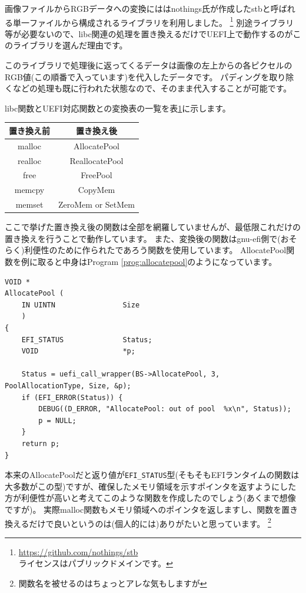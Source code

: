 \documentclass[10pt,b5paper,twoside,openany]{ltjsbook}
\begin{document}
画像ファイルからRGBデータへの変換にははnothings氏が作成したstbと呼ばれる単一ファイルから構成されるライブラリを利用しました。
\footnote{\url{https://github.com/nothings/stb} \\ ライセンスはパブリックドメインです。}
別途ライブラリ等が必要ないので、libc関連の処理を置き換えるだけでUEFI上で動作するのがこのライブラリを選んだ理由です。

このライブラリで処理後に返ってくるデータは画像の左上からの各ピクセルのRGB値(この順番で入っています)を代入したデータです。
パディングを取り除くなどの処理も既に行われた状態なので、そのまま代入することが可能です。

libc関数とUEFI対応関数との変換表の一覧を表\ref{tb:function}に示します。
\begin{table}[H]
    \centering
    \begin{tabular}{|c|c|}
        \hline
        置き換え前 & 置き換え後 \\
        \hline
        malloc & AllocatePool \\
        realloc & ReallocatePool \\
        free & FreePool \\
        memcpy & CopyMem \\
        memset & ZeroMem or SetMem \\
        \hline
    \end{tabular}
    \label{tb:function}
\end{table}
ここで挙げた置き換え後の関数は全部を網羅していませんが、最低限これだけの置き換えを行うことで動作しています。
また、変換後の関数はgnu-efi側で(おそらく)利便性のために作られたであろう関数を使用しています。
AllocatePool関数を例に取ると中身はProgram \ref{prog:allocatepool}のようになっています。
\begin{lstlisting}[style=customC,caption=AllocatePool function,label=prog:allocatepool]
VOID *
AllocatePool (
    IN UINTN                Size
    )
{
    EFI_STATUS              Status;
    VOID                    *p;

    Status = uefi_call_wrapper(BS->AllocatePool, 3, PoolAllocationType, Size, &p);
    if (EFI_ERROR(Status)) {
        DEBUG((D_ERROR, "AllocatePool: out of pool  %x\n", Status));
        p = NULL;
    }
    return p;
}
\end{lstlisting}
本来のAllocatePoolだと返り値が\verb+EFI_STATUS+型(そもそもEFIランタイムの関数は大多数がこの型)ですが、確保したメモリ領域を示すポインタを返すようにした方が利便性が高いと考えてこのような関数を作成したのでしょう(あくまで想像ですが)。
実際malloc関数もメモリ領域へのポインタを返しますし、関数を置き換えるだけで良いというのは(個人的には)ありがたいと思っています。
\footnote{関数名を被せるのはちょっとアレな気もしますが}
\end{document}
